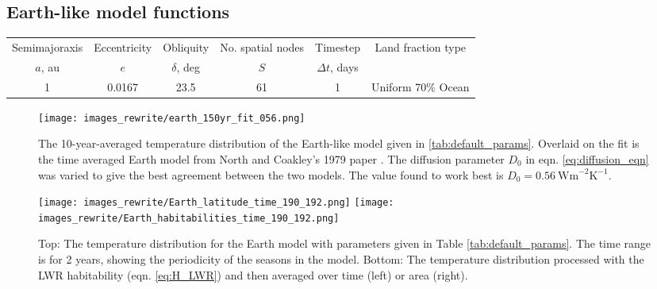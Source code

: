 \documentclass[12pt, onecolumn]{revtex4-2}    %
\newcommand{\diffusion}{\ensuremath{\ \text{Wm}^{-2} \text{K}^{-1}}}
\newcommand{\degrees}{\ensuremath{^{\circ}}}
\begin{document}
\subsection{Earth-like model functions} \label{ssec:EarthLikeModel}
%
\begin{table*}
  \begin{tabular}{|c|c|c|c|c|c|}
    \hline
    Semimajoraxis & Eccentricity & Obliquity     & No. spatial nodes & Timestep         & \multirow{2}{*}{Land fraction type} \\
    $a$, au       & $e$          & $\delta$, deg & $S$               & $\Delta t$, days &                                     \\
    \hline
    1             & 0.0167       & 23.5          & 61                & 1                & Uniform 70\% Ocean                  \\
    \hline
  \end{tabular}
  \caption{A summary of the default parameters for the Earth-like model.
    A `Uniform' land fraction indicates that the model has the same ratio of land to ocean across the entire planet.
    The odd number of spatial nodes means there is a true equator with $\lambda = 0$ as well as poles with $\lambda = \pm 90\degrees$}
  \label{tab:default_params}
\end{table*}

\begin{figure}[t]
  \texttt{[image: images\_rewrite/earth\_150yr\_fit\_056.png]}
  \caption{
    The 10-year-averaged temperature distribution of the Earth-like model given in \ref{tab:default_params}.
    Overlaid on the fit is the time averaged Earth model from North and Coakley's 1979 paper \cite{NC79}.
    The diffusion parameter $D_0$ in eqn. \eqref{eq:diffusion_eqn} was varied to give the best agreement between the two models.
    The value found to work best is $D_0 = 0.56 \diffusion$.
  }
  \label{fig:NC_fit}
\end{figure}

\begin{figure}[t]
  \texttt{[image: images\_rewrite/Earth\_latitude\_time\_190\_192.png]}
  \texttt{[image: images\_rewrite/Earth\_habitabilities\_time\_190\_192.png]}
  \caption{
    Top: The temperature distribution for the Earth model with parameters given in Table \ref{tab:default_params}.
    The time range is for 2 years, showing the periodicity of the seasons in the model.
    Bottom: The temperature distribution processed with the LWR habitability (eqn. \eqref{eq:H_LWR}) and then averaged over time (left) or area (right).
  }
  \label{fig:Earth_lat_time}
\end{figure}
\end{document}
